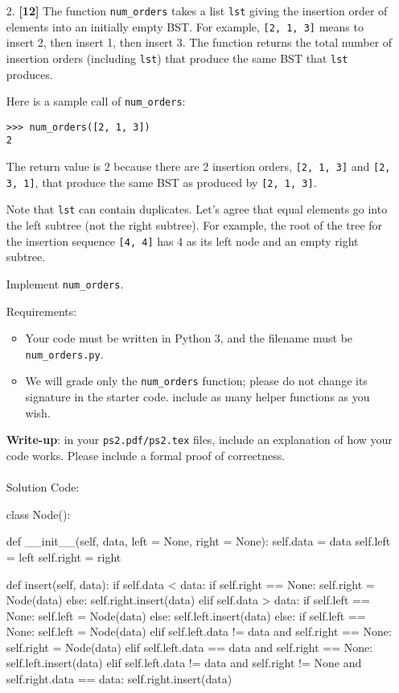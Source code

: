 \documentclass{assignment-263}
\begin{document}
\begin{enumerate}
\item[2.] \textbf{[12]} 
The function \verb|num_orders| takes a list \verb|lst| giving the insertion order of elements into an initially empty BST. For example, \verb|[2, 1, 3]| means to insert 2, then insert 1, then insert 3.
The function returns the total number of insertion orders (including \verb|lst|) that produce the same BST that \verb|lst| produces. 

Here is a sample call of \verb|num_orders|:
\begin{verbatim}
>>> num_orders([2, 1, 3])
2
\end{verbatim}
The return value is 2 because there are 2 insertion orders, \verb|[2, 1, 3]| and \verb|[2, 3, 1]|, that produce the same BST as produced by \verb|[2, 1, 3]|.

Note that \verb|lst| can contain duplicates. Let's agree that equal elements go into the left subtree (not the right subtree). For example, the root of the tree for the insertion sequence \verb|[4, 4]| has 4 as its left node and an empty right subtree.

Implement \verb|num_orders|.

Requirements:
\begin{itemize}
\item Your code must be written in Python 3, and the filename must be \verb|num_orders.py|.
\item We will grade only the \verb|num_orders| function; please do not change its signature in the starter code. include as many helper functions as you wish.
   \end{itemize}

\textbf{Write-up}: in your \verb|ps2.pdf/ps2.tex| files, include an explanation of how your code works. Please include a formal proof of correctness.\\
\\
Solution Code:\\
\begin{python}
class Node():
  
      def __init__(self, data, left = None, right = None):
            self.data =  data
            self.left = left
            self.right = right  
    
      def insert(self, data):
            if self.data < data:
                  if self.right == None:
                        self.right = Node(data)
                  else:
                        self.right.insert(data)
            elif self.data > data:
                  if self.left == None:
                        self.left = Node(data)
                  else:
                        self.left.insert(data)            
            else:
                  if self.left == None:
                        self.left = Node(data)
                  elif self.left.data != data and self.right == None:
                        self.right = Node(data)
                  elif self.left.data == data and self.right == None:
                        self.left.insert(data)
                  elif self.left.data != data and self.right != None and self.right.data == data:
                        self.right.insert(data)
                        

\end{python}
\end{enumerate}
\end{document}

